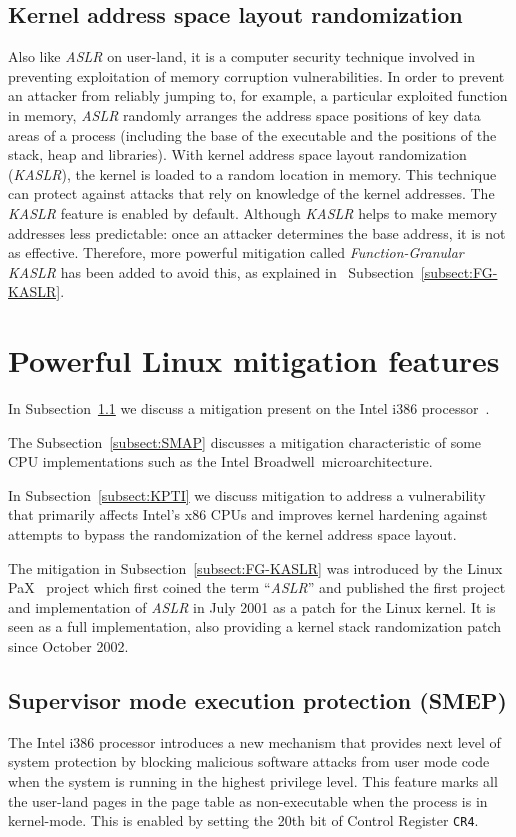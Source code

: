 \documentclass{masterthesis}
\newcommand{\refToSubSection}[1]{Subsection~\ref{subsect:#1}\xspace}
\begin{document}
\subsection{Kernel address space layout randomization}
\label{subsect:KASLR}
Also like \emph{ASLR} on user-land, it is a computer security technique involved in preventing exploitation of memory corruption vulnerabilities. 
In order to prevent an attacker from reliably jumping to, for example, a particular exploited function in memory, \emph{ASLR} randomly arranges the address space positions of key data areas of a process (including the base of the executable and the positions of the stack, heap and libraries).
With kernel address space layout randomization (\emph{KASLR}), the kernel is loaded to a random location in memory.
This technique can protect against attacks that rely on knowledge of the kernel addresses.
The \emph{KASLR} feature is enabled by default.
Although \emph{KASLR} helps to make memory addresses less predictable: once an attacker determines the base address, it is not as effective.
Therefore, more powerful mitigation called \emph{Function-Granular KASLR} has been added to avoid this, as explained in ~\refToSubSection{FG-KASLR}.

\section{Powerful Linux mitigation features}
\label{sect:powerful mitigation}
In \refToSubSection{SMEP} we discuss a mitigation present on the Intel i386 processor~\cite{inteli386}.

The \refToSubSection{SMAP} discusses a mitigation characteristic of some CPU implementations such as the Intel Broadwell~\cite{nalamalpu2015broadwell}microarchitecture.

In \refToSubSection{KPTI} we discuss mitigation to address a vulnerability that primarily affects Intel's x86 CPUs and improves kernel hardening against attempts to bypass the randomization of the kernel address space layout.

The mitigation in \refToSubSection{FG-KASLR} was introduced by the Linux PaX~\cite{marco2016exploiting} project which first coined the term ``\emph{ASLR}'' and published the first project and implementation of \emph{ASLR} in July 2001 as a patch for the Linux kernel. It is seen as a full implementation, also providing a kernel stack randomization patch since October 2002.
\subsection{Supervisor mode execution protection (SMEP)}
\label{subsect:SMEP}
The Intel i386 processor introduces a new mechanism that provides next level of system protection by blocking malicious software attacks from user mode code when the system is running in the highest privilege level.
This feature marks all the user-land pages in the page table as non-executable when the process is in kernel-mode. This is enabled by setting the 20th bit of Control Register \texttt{CR4}.
\end{document}
